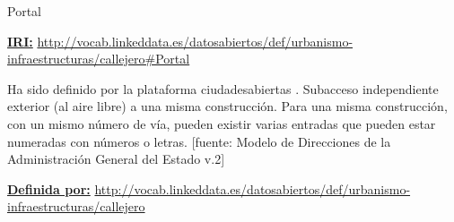 \begin{mybox}{Portal}
\begin{flushleft}
\underline{\textbf{IRI:}}
\url{http://vocab.linkeddata.es/datosabiertos/def/urbanismo-infraestructuras/callejero#Portal}
\newline

Ha sido definido por la plataforma ciudadesabiertas \cite{datosabiertos_portal}.
Subacceso independiente exterior (al aire libre) a una misma construcción. Para una misma construcción, con un mismo número de vía, pueden existir varias entradas que pueden estar numeradas con números o letras. [fuente: Modelo de Direcciones de la Administración General del Estado v.2]
\newline

\underline{\textbf{Definida por:}}\newline
\url{http://vocab.linkeddata.es/datosabiertos/def/urbanismo-infraestructuras/callejero}
\newline


\end{flushleft}
\end{mybox}


